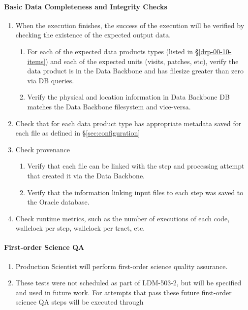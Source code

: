 \paragraph{Basic Data Completeness and Integrity Checks}\label{basic_checks}
\begin{enumerate}
  \item{When the execution finishes, the success of the execution will be verified by checking the existence of the expected output data.}
    \begin{enumerate}

       \item{For each of the expected data products types (listed
       in \S\ref{drp-00-10-items}) and each of the expected units
       (visits, patches, etc), verify the data product is in the 
       Data Backbone and has filesize greater than zero via DB 
       queries.}

       \item{Verify the physical and location information in Data
       Backbone DB matches the Data Backbone filesystem and
       vice-versa.}

    \end{enumerate}
  \item{Check that for each data product type has appropriate metadata saved for each file as defined in \S\ref{sec:configuration}}
  \item{Check provenance}
    \begin{enumerate}
        \item{Verify that each file can be linked with the step and processing attempt that created it via the Data Backbone.}
        \item{Verify that the information linking input files to each step was saved to the Oracle database.}
    \end{enumerate}
  \item{Check runtime metrics, such as the number of executions of each code, wallclock per step, wallclock per tract,
        etc.}
\end{enumerate}

\paragraph{First-order Science QA}\label{first-order-qa}
\begin{enumerate}
  \item{Production Scientist will perform first-order science quality assurance.}
  \item{These tests were not scheduled as part of LDM-503-2, but will be specified and used in future work.
  For attempts that pass these future first-order science QA steps will be executed through }
\end{enumerate}
